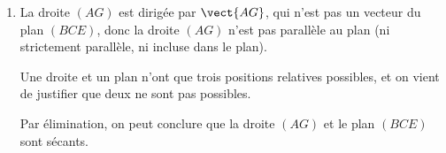 \begin{enumerate}
\begin{enumerate}
On a :
\[
\vect{AG}\begin{pmatrix}5\\1\\1\end{pmatrix}.
\]
Donc :
\[
\begin{aligned}
\vect{AG}=a\vect{BC}+b\vect{BE}
&\Longleftrightarrow
\begin{cases}
2a+b=5\\
a-4b=1\\
2a-b=1
\end{cases}\\
&\Longleftrightarrow
\begin{cases}
b=5-2a\\
a-4(5-2a)=1\\
2a-(5-2a)=1
\end{cases}\\
&\Longleftrightarrow
\begin{cases}
b=5-2a\\
9a-20=1\\
4a-5=1
\end{cases}\\
&\Longleftrightarrow
\begin{cases}
b=5-2a\\
9a=21\\
4a=6
\end{cases}\\
&\Longleftrightarrow
\begin{cases}
b=5-2a\\
a=\dfrac73\\
a=\dfrac32.
\end{cases}
\end{aligned}
\]
Les équations du système ne sont pas compatibles.

Donc le système n'a pas de solution.

Donc les vecteurs $\vect{BE}$, $\vect{BC}$ et $\vect{AG}$ ne sont pas coplanaires.

\item La droite $(AG)$ est dirigée par $\vect{AG}$, qui n'est pas un vecteur du plan $(BCE)$, donc la droite $(AG)$ n'est pas parallèle au plan (ni strictement parallèle, ni incluse dans le plan).

Une droite et un plan n'ont que trois positions relatives possibles, et on vient de justifier que deux ne sont pas possibles.

Par élimination, on peut conclure que la droite $(AG)$ et le plan $(BCE)$ sont sécants.
\end{enumerate}


\end{enumerate}
